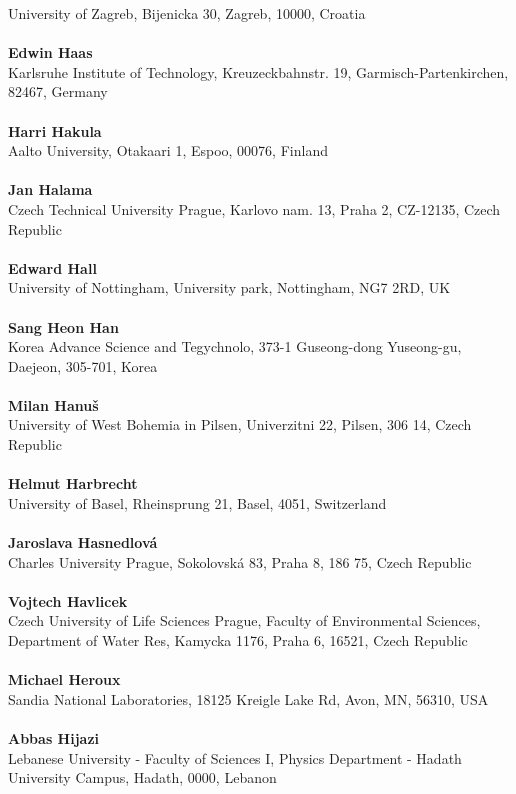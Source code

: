 University of Zagreb, Bijenicka 30, Zagreb, 10000, Croatia\\ 
\\ 
\textbf{Edwin Haas}
\\ 
Karlsruhe Institute of Technology, Kreuzeckbahnstr. 19, Garmisch-Partenkirchen, 82467, Germany\\ 
\\ 
\textbf{Harri Hakula}
\\ 
Aalto University, Otakaari 1, Espoo, 00076, Finland\\ 
\\ 
\textbf{Jan Halama}
\\ 
Czech Technical University Prague, Karlovo nam. 13, Praha 2, CZ-12135, Czech Republic\\ 
\\ 
\textbf{Edward Hall}
\\ 
University of Nottingham, University park, Nottingham, NG7 2RD, UK\\ 
\\ 
\textbf{Sang Heon Han}
\\ 
Korea Advance Science and Tegychnolo, 373-1 Guseong-dong Yuseong-gu, Daejeon, 305-701, Korea\\ 
\\ 
\textbf{Milan Hanu\v{s}}
\\ 
University of West Bohemia in Pilsen, Univerzitni 22, Pilsen, 306 14, Czech Republic\\ 
\\ 
\textbf{Helmut Harbrecht}
\\ 
University of Basel, Rheinsprung 21, Basel, 4051, Switzerland\\ 
\\ 
\textbf{Jaroslava Hasnedlov\'a}
\\ 
Charles University Prague, Sokolovsk\'a 83, Praha 8, 186 75, Czech Republic\\ 
\\ 
\textbf{Vojtech Havlicek}
\\ 
Czech University of Life Sciences Prague, Faculty of Environmental Sciences, Department of Water Res, Kamycka 1176, Praha 6, 16521, Czech Republic\\ 
\\ 
\textbf{Michael Heroux}
\\ 
Sandia National Laboratories, 18125 Kreigle Lake Rd, Avon, MN, 56310, USA\\ 
\\ 
\textbf{Abbas Hijazi}
\\ 
Lebanese University - Faculty of Sciences I, Physics Department - Hadath University Campus, Hadath, 0000, Lebanon\\ 
